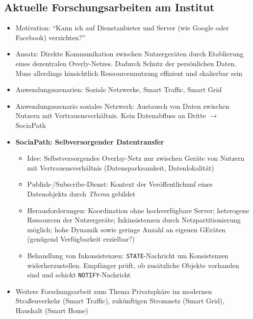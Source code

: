 \subsection{Aktuelle Forschungsarbeiten am Institut}
\begin{itemize}
	\item Motivation: "`Kann ich auf Dienstanbieter und Server (wie Google oder Facebook) verzichten?"'
	\item Ansatz: Direkte Kommunikation zwischen Nutzergeräten durch Etablierung eines dezentralen Overly-Netzes. Dadurch Schutz der persönlichen Daten. Muss allerdings hinsichtlich Ressourcennutzung effizient und skalierbar sein
	\item Anwendungsszenarien: Soziale Netzwerke, Smart Traffic, Smart Grid
	\item Anwendungsszenario soziales Netzwerk: Austausch von Daten zwischen Nutzern mit Vertrauensverhältnis. Kein Datenabfluss an Dritte \(\rightarrow\) SociaPath
	\item \textbf{SociaPath: Selbversorgender Datentransfer}
	\begin{itemize}
		\item Idee: Selbstversorgendes Overlay-Netz nur zwischen Geräte von Nutzern mit Vertrauensverhältnis (Datensparksamkeit, Datenlokalität)
		\item Publish-/Subscribe-Dienst: Kontext der Veröffentlichunf eines Datenobjekts durch \textit{Thema} gebildet
		\item Herausforderungen: Koordination ohne hochverfügbare Server; heterogene Ressourcen der Nutzergeräte; Inkinsistenzen durch Netzpartitionierung möglich; hohe Dynamik sowie geringe Anzahl an eigenen GEräten (genügend Verfügbarkeit erzielbar?)
		\item Behandlung von Inkonsistenzen: \texttt{STATE}-Nachricht um Konsistenzen widerherzustellen. Empfänger prüft, ob zusätzliche Objekte vorhanden sind und schickt \texttt{NOTIFY}-Nachricht
	\end{itemize}
	\item Weitere Forschungsarbeit zum Thema Privatsphäre im modernen Straßenverkehr (Smart Traffic), zukünftigen Stromnetz (Smart Grid), Haushalt (Smart Home)
\end{itemize}
